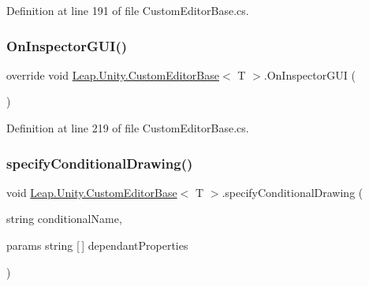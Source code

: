 Definition at line 191 of file Custom\+Editor\+Base.\+cs.

\mbox{\label{class_leap_1_1_unity_1_1_custom_editor_base_aede403b8b7e1c92cda1f1ad843c804cb}} 
\subsubsection{\texorpdfstring{OnInspectorGUI()}{OnInspectorGUI()}}
{\footnotesize\ttfamily override void \mbox{\hyperlink{class_leap_1_1_unity_1_1_custom_editor_base}{Leap.\+Unity.\+Custom\+Editor\+Base}}$<$ T $>$.On\+Inspector\+G\+UI (\begin{DoxyParamCaption}{ }\end{DoxyParamCaption})}



Definition at line 219 of file Custom\+Editor\+Base.\+cs.

\mbox{\label{class_leap_1_1_unity_1_1_custom_editor_base_a050b2c7054d16bc8e497877eed360664}} 
\subsubsection{\texorpdfstring{specifyConditionalDrawing()}{specifyConditionalDrawing()}\hspace{0.1cm}{\footnotesize\ttfamily [1/3]}}
{\footnotesize\ttfamily void \mbox{\hyperlink{class_leap_1_1_unity_1_1_custom_editor_base}{Leap.\+Unity.\+Custom\+Editor\+Base}}$<$ T $>$.specify\+Conditional\+Drawing (\begin{DoxyParamCaption}\item[{string}]{conditional\+Name,  }\item[{params string \mbox{[}$\,$\mbox{]}}]{dependant\+Properties }\end{DoxyParamCaption})\hspace{0.3cm}{\ttfamily [protected]}}



